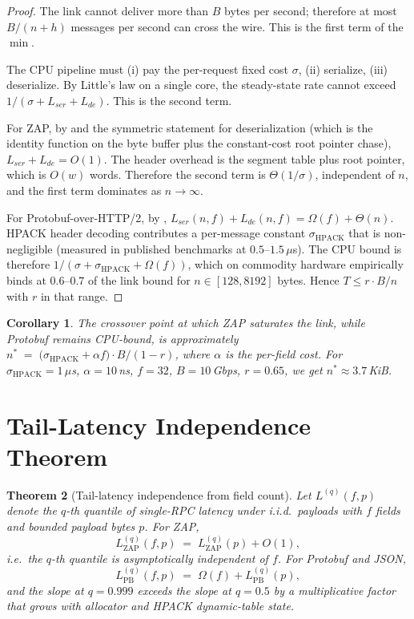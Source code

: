 \documentclass[11pt]{article}
\newtheorem{theorem}{Theorem}
\newtheorem{corollary}[theorem]{Corollary}
\theoremstyle{definition}
\theoremstyle{remark}
\begin{document}
\begin{proof}
The link cannot deliver more than $B$ bytes per second; therefore at
most $B/(n+h)$ messages per second can cross the wire. This is the
first term of the $\min$.

The CPU pipeline must (i) pay the per-request fixed cost $\sigma$,
(ii) serialize, (iii) deserialize. By Little's law on a single core,
the steady-state rate cannot exceed
$1/(\sigma + L_{\textit{ser}} + L_{\textit{de}})$. This is the second term.

For ZAP, by  and the symmetric statement for
deserialization (which is the identity function on the byte buffer
plus the constant-cost root pointer chase), $L_{\textit{ser}}+L_{\textit{de}}=O(1)$.
The header overhead is the segment table plus root pointer, which is
$O(w)$ words. Therefore the second term is $\Theta(1/\sigma)$,
independent of $n$, and the first term dominates as $n \to \infty$.

For Protobuf-over-HTTP/2, by ,
$L_{\textit{ser}}(n,f)+L_{\textit{de}}(n,f) = \Omega(f) + \Theta(n)$. HPACK
header decoding contributes a per-message constant
$\sigma_{\mathrm{HPACK}}$ that is non-negligible (measured in published
benchmarks at $0.5$--$1.5\,\mu$s). The CPU bound is therefore
$1/(\sigma + \sigma_{\mathrm{HPACK}} + \Omega(f))$, which on commodity
hardware empirically binds at $0.6$--$0.7$ of the link bound for
$n \in [128, 8192]$ bytes. Hence $T \leq r \cdot B/n$ with $r$ in that
range.
\end{proof}

\begin{corollary}
The crossover point at which ZAP saturates the link, while Protobuf
remains CPU-bound, is approximately
$n^* \;=\; \big(\sigma_{\mathrm{HPACK}} + \alpha f\big) \cdot B / (1-r)$,
where $\alpha$ is the per-field cost. For $\sigma_{\mathrm{HPACK}}=1\,\mu$s,
$\alpha=10$\,ns, $f=32$, $B=10$\,Gbps, $r=0.65$, we get
$n^* \approx 3.7$\,KiB.
\end{corollary}

\section{Tail-Latency Independence Theorem}
\label{sec:thmtail}

\begin{theorem}[Tail-latency independence from field count]
\label{thm:tail}
Let $L^{(q)}(f,p)$ denote the $q$-th quantile of single-RPC latency
under i.i.d.\ payloads with $f$ fields and bounded payload bytes
$p$. For ZAP,
\[
  L^{(q)}_{\mathrm{ZAP}}(f,p) \;=\; L^{(q)}_{\mathrm{ZAP}}(p) + O(1),
\]
i.e.\ the $q$-th quantile is asymptotically independent of $f$.
For Protobuf and JSON,
\[
  L^{(q)}_{\mathrm{PB}}(f,p) \;=\; \Omega(f) + L^{(q)}_{\mathrm{PB}}(p),
\]
and the slope at $q=0.999$ exceeds the slope at $q=0.5$ by a
multiplicative factor that grows with allocator and HPACK
dynamic-table state.
\end{theorem}
\end{document}
